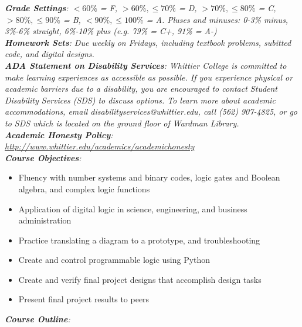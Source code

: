 \documentclass[10pt]{article}
\begin{document}
\textit{\textbf{Grade Settings}: $<60\%$ = F, $>60\%,\leq 70\%$ = D, $>70\%,\leq80\%$ = C, $>80\%,\leq 90\%$ = B, $<90\%,\leq 100\%$ = A.  Pluses and minuses: 0-3\% minus, 3\%-6\% straight, 6\%-10\% plus (e.g. 79\% = C+, 91\% = A-)} \\
\textit{\textbf{Homework Sets}: Due weekly on Fridays, including textbook problems, subitted code, and digital designs.} \\
\textit{\textbf{ADA Statement on Disability Services}: Whittier College is committed to make learning experiences as accessible as possible. If you experience physical or academic barriers due to a disability, you are encouraged to contact Student Disability Services (SDS) to discuss options. To learn more about academic accommodations, email disabilityservices@whittier.edu, call (562) 907-4825, or go to SDS which is located on the ground floor of Wardman Library.} \\
\textit{\textbf{Academic Honesty Policy}: \url{http://www.whittier.edu/academics/academichonesty}} \\
\textit{\textbf{Course Objectives}:}
\begin{itemize}
\item Fluency with number systems and binary codes, logic gates and Boolean algebra, and complex logic functions
\item Application of digital logic in science, engineering, and business administration
\item Practice translating a diagram to a prototype, and troubleshooting
\item Create and control programmable logic using Python
\item Create and verify final project designs that accomplish design tasks
\item Present final project results to peers
\end{itemize}
\clearpage
\textit{\textbf{Course Outline}:}
\end{document}
